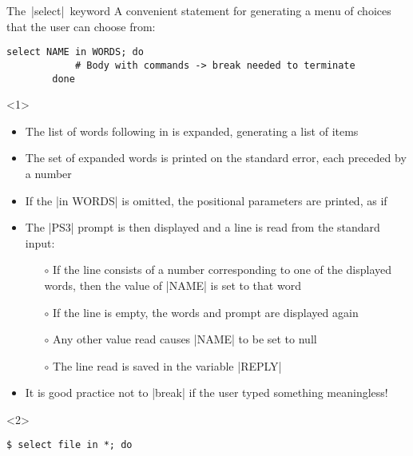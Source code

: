 \begin{frame}[fragile]{The \,\bash|select|\, keyword}
    \vspace{-3mm}
    A convenient statement for generating a menu of choices that the user can choose from:
    \medskip
    \begin{lstlisting}[style=MyBash, numbers=none, belowskip=-5mm]
        select NAME in WORDS; do
            # Body with commands -> break needed to terminate
        done
    \end{lstlisting}
    \begin{overlayarea}{\textwidth}{\textheight}
        \begin{onlyenv}<1>
            \begin{itemize}
                \item The list of words following in is expanded, generating a list of items
                \item The set of expanded words is printed on the \alert{standard error}, each preceded by a number
                \item If the \bash|in WORDS| is omitted, the positional parameters are printed, as if 
                \item The \bash|PS3| prompt is then displayed and a line is read from the standard input:
                      \begin{itemize}
                          \item[$\circ$] If the line consists of a number corresponding to one of the displayed words, then the value of \bash|NAME| is set to that word
                          \item[$\circ$] If the line is empty, the words and prompt are displayed again
                          \item[$\circ$] Any other value read causes \bash|NAME| to be set to null
                          \item[$\circ$] The line read is saved in the variable \bash|REPLY|
                      \end{itemize}
                \item It is good practice not to \bash|break| if the user typed something meaningless!
            \end{itemize}
        \end{onlyenv}
        \begin{onlyenv}<2>
            \begin{lstlisting}[style=MyBash]
                $ select file in *; do

\end{lstlisting}
\end{onlyenv}
\end{overlayarea}
\end{frame}
